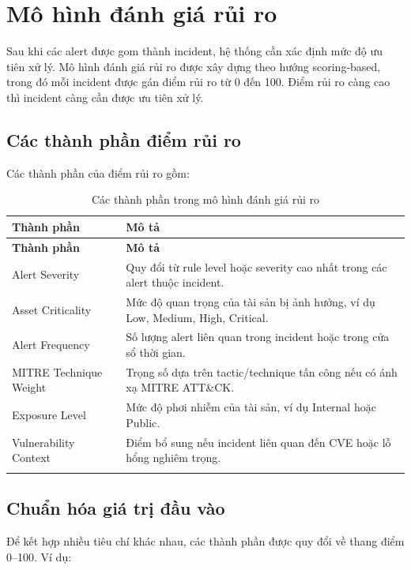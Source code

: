 \documentclass[a4paper,12pt,oneside]{book}
\begin{document}
\section{Mô hình đánh giá rủi ro}
{\fontsize{13pt}{15.6pt}\selectfont

Sau khi các alert được gom thành incident, hệ thống cần xác định mức độ ưu tiên xử lý. Mô hình đánh giá rủi ro được xây dựng theo hướng scoring-based, trong đó mỗi incident được gán điểm rủi ro từ 0 đến 100. Điểm rủi ro càng cao thì incident càng cần được ưu tiên xử lý.

\subsection{Các thành phần điểm rủi ro}
{\fontsize{13pt}{15.6pt}\selectfont

Các thành phần của điểm rủi ro gồm:

\begin{longtable}{|L{3.9cm}|L{10.4cm}|}
\hline
\textbf{Thành phần} & \textbf{Mô tả} \\
\hline
\endfirsthead
\hline
\textbf{Thành phần} & \textbf{Mô tả} \\
\hline
\endhead
Alert Severity & Quy đổi từ rule level hoặc severity cao nhất trong các alert thuộc incident. \\
\hline
Asset Criticality & Mức độ quan trọng của tài sản bị ảnh hưởng, ví dụ Low, Medium, High, Critical. \\
\hline
Alert Frequency & Số lượng alert liên quan trong incident hoặc trong cửa sổ thời gian. \\
\hline
MITRE Technique Weight & Trọng số dựa trên tactic/technique tấn công nếu có ánh xạ MITRE ATT\&CK. \\
\hline
Exposure Level & Mức độ phơi nhiễm của tài sản, ví dụ Internal hoặc Public. \\
\hline
Vulnerability Context & Điểm bổ sung nếu incident liên quan đến CVE hoặc lỗ hổng nghiêm trọng. \\
\hline
\caption{Các thành phần trong mô hình đánh giá rủi ro}\\
\end{longtable}

}

\subsection{Chuẩn hóa giá trị đầu vào}
{\fontsize{13pt}{15.6pt}\selectfont

Để kết hợp nhiều tiêu chí khác nhau, các thành phần được quy đổi về thang điểm 0--100. Ví dụ:

}}
\end{document}
